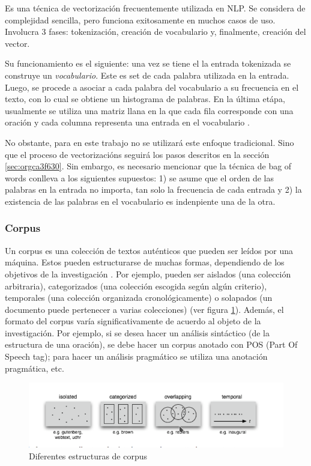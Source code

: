 \documentclass[12pt,letterpaper,twoside]{article}
\begin{document}
Es una técnica de vectorización frecuentemente utilizada en NLP.
Se considera de complejidad sencilla, pero funciona exitosamente
en muchos casos de uso. Involucra 3 fases: tokenización, creación de vocabulario y,
finalmente, creación del vector.

Su funcionamiento es el siguiente: una vez se tiene el la entrada
tokenizada se construye un \emph{vocabulario}.  Este es set de cada
palabra utilizada en la entrada.  Luego, se procede a asociar a
cada palabra del vocabulario a su frecuencia en el texto, con lo
cual se obtiene un histograma de palabras. En la última etápa,
usualmente se utiliza una matriz llana en la que cada fila
corresponde con una oración y cada columna representa una entrada
en el vocabulario \cite{jha_abhishek_vectorization}.

No obstante, para en este trabajo no se utilizará este enfoque
tradicional.  Sino que el proceso de vectorizacións seguirá los
pasos descritos en la sección \ref{sec:orgca3f630}. Sin embargo,
es necesario mencionar que la técnica de bag of words conlleva
a los siguientes supuestos: 1) se asume que el orden de las
palabras en la entrada no importa, tan solo la frecuencia
de cada entrada y 2) la existencia de las palabras en el
vocabulario es indenpiente una de la otra.  
\subsubsection{Corpus}
\label{sec:org53a56e6}


Un corpus es una colección de textos auténticos que pueden ser
leídos por una máquina. Estos pueden estructurarse de muchas
formas, dependiendo de los objetivos de la investigación
\cite{indurkhya2010handbook}. Por ejemplo, pueden ser aislados (una
colección arbitraria), categorizados (una colección escogida según
algún criterio), temporales (una colección organizada
cronológicamente) o solapados (un documento puede pertenecer a
varias colecciones) \cite{bird2009natural} (ver figura
\ref{fig:org6a3dd54}). Además, el formato del corpus varía
significativamente de acuerdo al objeto de la investigación. Por
ejemplo, si se desea hacer un análisis sintáctico (de la estructura
de una oración), se debe hacer un corpus anotado con POS (Part Of
Speech tag); para hacer un análisis pragmático se utiliza una
anotación pragmática, etc.



\begin{figure}[htbp]
\centering
\includegraphics[width=.9\linewidth]{./assets/estructuras_de_corpus.png}
\caption{\label{fig:org6a3dd54}Diferentes estructuras de corpus}
\end{figure}
\end{document}
